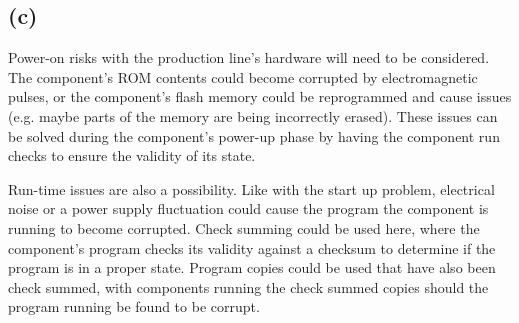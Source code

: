 \documentclass[]{report}
\begin{document}
			
			\subsection{(c)}
			Power-on risks with the production line's hardware will need to be considered. The component's ROM contents could become corrupted by electromagnetic pulses, or the component's flash memory could be reprogrammed and cause issues (e.g. maybe parts of the memory are being incorrectly erased). These issues can be solved during the component's power-up phase by having the component run checks to ensure the validity of its state.
			
			Run-time issues are also a possibility. Like with the start up problem, electrical noise or a power supply fluctuation could cause the program the component is running to become corrupted. Check summing could be used here, where the component's program checks its validity against a checksum to determine if the program is in a proper state. Program copies could be used that have also been check summed, with components running the check summed copies should the program running be found to be corrupt.


	
	
\end{document}
